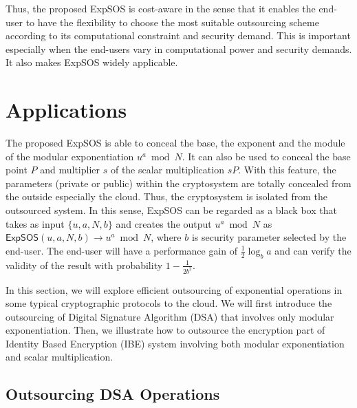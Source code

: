 \documentclass[english,draftcls,onecolumn,11pt]{IEEEtran}
\theoremstyle{definition}
\theoremstyle{plain}
\theoremstyle{plain}
\theoremstyle{definition}
\begin{document}
Thus, the proposed ExpSOS is cost-aware in the sense that it enables
the end-user to have the flexibility to choose the most suitable outsourcing
scheme according to its computational constraint and security demand.
This is important especially when the end-users vary in computational
power and security demands. It also makes ExpSOS widely applicable.


\section{Applications\label{sec:Application}}

The proposed ExpSOS is able to conceal the base, the exponent and
the module of the modular exponentiation $u^{a}\bmod N$. It can also
be used to conceal the base point $P$ and multiplier $s$ of the
scalar multiplication $sP$. With this feature, the parameters (private
or public) within the cryptosystem are totally concealed from the
outside especially the cloud. Thus, the cryptosystem is isolated from
the outsourced system. In this sense, ExpSOS can be regarded as a
black box that takes as input $\{u,a,N,b\}$ and creates the output
$u^{a}\bmod N$ as $\mathsf{ExpSOS}(u,a,N,b)\rightarrow u^{a}\bmod N$,
where $b$ is security parameter selected by the end-user. The end-user
will have a performance gain of $\frac{1}{2}\log_{b}a$ and can verify
the validity of the result with probability $1-\frac{1}{2b^{2}}$. 

In this section, we will explore efficient outsourcing of exponential
operations in some typical cryptographic protocols to the cloud. We
will first introduce the outsourcing of Digital Signature Algorithm
(DSA) that involves only modular exponentiation. Then, we illustrate
how to outsource the encryption part of Identity Based Encryption
(IBE) system involving both modular exponentiation and scalar multiplication. 


\subsection{Outsourcing DSA Operations}
\end{document}

